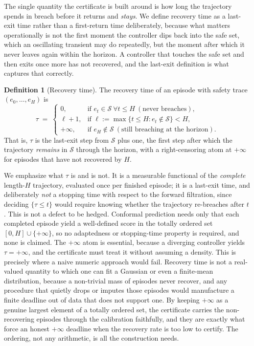 \documentclass[11pt]{article}
\theoremstyle{plain}
\theoremstyle{definition}
\newtheorem{definition}{Definition}
\newcommand{\Sset}{\mathcal{S}}
\begin{document}
The single quantity the certificate is built around is how long the trajectory spends in
breach before it returns and \emph{stays}. We define recovery time as a last-exit time rather
than a first-return time deliberately, because what matters operationally is not the first
moment the controller dips back into the safe set, which an oscillating transient may do
repeatedly, but the moment after which it never leaves again within the horizon. A
controller that touches the safe set and then exits once more has not recovered, and the
last-exit definition is what captures that correctly.

\begin{definition}[Recovery time]
\label{def:recovery}
The recovery time of an episode with safety trace $(e_0,\dots,e_H)$ is
\[
  \tau \;=\;
  \begin{cases}
    0, & \text{if } e_t \in \Sset \ \forall t \le H \ (\text{never breaches}),\\
    \ell+1, & \text{if } \ell := \max\{t \le H : e_t \notin \Sset\} < H,\\
    +\infty, & \text{if } e_H \notin \Sset \ (\text{still breaching at the horizon}).
  \end{cases}
\]
That is, $\tau$ is the last-exit step from $\Sset$ plus one, the first step after which the
trajectory \emph{remains} in $\Sset$ through the horizon, with a right-censoring atom at
$+\infty$ for episodes that have not recovered by $H$.
\end{definition}

We emphasize what $\tau$ is and is not. It is a measurable functional of the
\emph{complete} length-$H$ trajectory, evaluated once per finished episode; it is a last-exit
time, and deliberately \emph{not} a stopping time with respect to the forward filtration,
since deciding $\{\tau\le t\}$ would require knowing whether the trajectory re-breaches after
$t$. This is not a defect to be hedged. Conformal prediction needs only that each completed
episode yield a well-defined score in the totally ordered set $[0,H]\cup\{+\infty\}$, so no
adaptedness or stopping-time property is required, and none is claimed. The $+\infty$ atom is
essential, because a diverging
controller yields $\tau=+\infty$, and the certificate must treat it without assuming a
density. This is precisely where a naive numeric approach would fail. Recovery time is not a
real-valued quantity to which one can fit a Gaussian or even a finite-mean distribution,
because a non-trivial mass of episodes never recover, and any procedure that quietly drops or
imputes those episodes would manufacture a finite deadline out of data that does not support
one. By keeping $+\infty$ as a genuine largest element of a totally ordered set, the
certificate carries the non-recovering episodes through the calibration faithfully, and they
are exactly what force an honest $+\infty$ deadline when the recovery rate is too low to
certify. The ordering, not any arithmetic, is all the construction needs.
\end{document}
